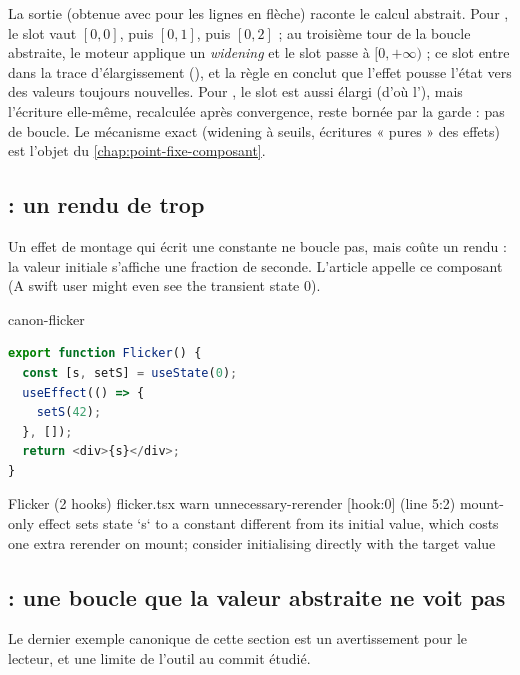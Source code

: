 La sortie (obtenue avec  pour les lignes en flèche) raconte le
calcul abstrait. Pour , le slot  vaut $[0,0]$, puis
$[0,1]$, puis $[0,2]$ ; au troisième tour de la boucle abstraite, le moteur
applique un \emph{widening} et le slot passe à $[0,+\infty)$ ; ce slot entre
dans la trace d'élargissement (), et la règle
 en conclut que l'effet pousse l'état vers des valeurs
toujours nouvelles. Pour , le slot est aussi élargi (d'où
l'\Info), mais l'écriture elle-même, recalculée après convergence, reste
bornée par la garde  : pas de boucle. Le mécanisme exact
(widening à seuils, écritures « pures » des effets) est l'objet du
\cref{chap:point-fixe-composant}.

\subsection{ : un rendu de trop}

Un effet de montage qui écrit une constante ne boucle pas, mais coûte un rendu :
la valeur initiale s'affiche une fraction de seconde. L'article appelle ce
composant  (\og A swift user might even see the transient state
0\fg{}).

\begin{exemple}{}{canon-flicker}
\begin{lstlisting}[language=TypeScript,caption={\code{Flicker} (\file{/tmp/ch02/flicker.tsx}, imports omis)},label={lst:react-modele-flicker}]
export function Flicker() {
  const [s, setS] = useState(0);
  useEffect(() => {
    setS(42);
  }, []);
  return <div>{s}</div>;
}
\end{lstlisting}
\begin{sortie}
  Flicker  (2 hooks)  flicker.tsx
    warn   unnecessary-rerender  [hook:0]  (line 5:2)  mount-only effect sets state `s` to a constant different from its initial value, which costs one extra rerender on mount; consider initialising directly with the target value
\end{sortie}
\end{exemple}

\subsection{ : une boucle que la valeur abstraite ne voit pas}

Le dernier exemple canonique de cette section est un avertissement pour le
lecteur, et une limite de l'outil au commit étudié.

